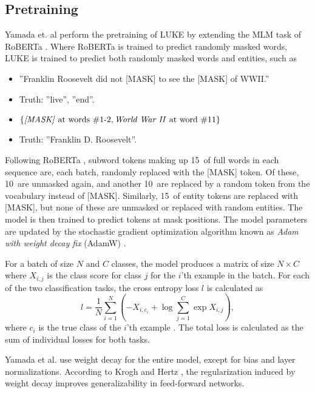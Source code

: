 \documentclass[main.tex]{subfiles}
\begin{document}
\subsection{Pretraining}
\label{subsec:lukepre}
Yamada et. al perform the pretraining of LUKE by extending the MLM task of RoBERTa \cite{liu2019roberta}.
Where RoBERTa is trained to predict randomly masked words, LUKE is trained to predict both randomly masked words and entities, such as
\begin{itemize}
    \item ''Franklin Roosevelt did not [MASK] to see the [MASK] of WWII.''
    \item[] Truth: ''live'', ''end''.
    \item $\{\text{\emph{[MASK]} at words \#1-2}, \text{\emph{World War II} at word \#11}\}$
    \item[] Truth: ''Franklin D. Roosevelt''.
\end{itemize}
Following RoBERTa \cite{liu2019roberta}, subword tokens making up 15\pro\ of full words in each sequence are, each batch, randomly replaced with the [MASK] token.
Of these, 10\pro\ are unmasked again, and another 10\pro\ are replaced by a random token from the vocabulary instead of [MASK].
Similarly, 15\pro\ of entity tokens are replaced with [MASK], but none of these are unmasked or replaced with random entities.
The model is then trained to predict tokens at mask positions.
The model parameters are updated by the stochastic gradient optimization algorithm known as \emph{Adam with weight decay fix} (AdamW) \cite{hutter2019adamw}.

For a batch of size $ N $ and $ C $ classes, the model produces a matrix of size $ N\times C $ where $ X_{i, j} $ is the class score for class $ j $ for the $ i $'th example in the batch.
For each of the two classification tasks, the cross entropy loss $ l $ is calculated as
\begin{equation}\label{eq:crossentropyloss}
    l = \frac{1}{N} \sum_{i=1}^N \left(
        -X_{i, c_i} + \log \sum_{j=1}^C \exp X_{i, j}
    \right),
\end{equation}
where $ c_i $ is the true class of the $ i $'th example \cite{pytorchcel}.
The total loss is calculated as the sum of individual losses for both tasks.

Yamada et al. \cite{yamada2020luke} use weight decay for the entire model, except for bias and layer normalizations.
According to Krogh and Hertz \cite{krogh1991weight}, the regularization induced by weight decay improves generalizability in feed-forward networks.
\end{document}
